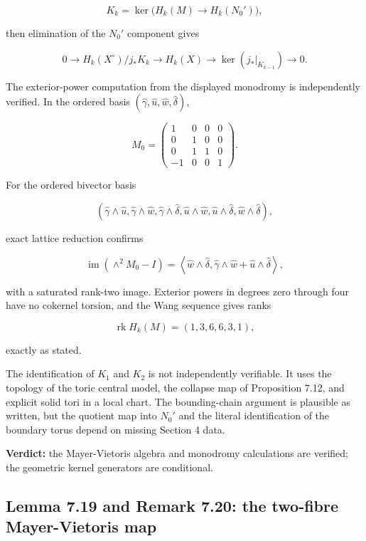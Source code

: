\documentclass[
  10pt,
]{article}
\begin{document}
\[
K_k=\ker\bigl(H_k(M)\to H_k(N_0')\bigr),
\]

then elimination of the \(N_0'\) component gives

\[
0\to H_k(X^\circ)/j_*K_k\to H_k(X)
\to\ker(j_*|_{K_{k-1}})\to0.
\]

The exterior-power computation from the displayed monodromy is
independently verified. In the ordered basis
\((\widehat\gamma,\widehat u,\widehat w,\widehat\delta)\),

\[
M_0=
\begin{pmatrix}
1&0&0&0\\
0&1&0&0\\
0&1&1&0\\
-1&0&0&1
\end{pmatrix}.
\]

For the ordered bivector basis

\[
(\widehat\gamma\wedge\widehat u,
 \widehat\gamma\wedge\widehat w,
 \widehat\gamma\wedge\widehat\delta,
 \widehat u\wedge\widehat w,
 \widehat u\wedge\widehat\delta,
 \widehat w\wedge\widehat\delta),
\]

exact lattice reduction confirms

\[
\operatorname{im}(\wedge^2M_0-I)
 =\left\langle
 \widehat w\wedge\widehat\delta,
 \widehat\gamma\wedge\widehat w+\widehat u\wedge\widehat\delta
 \right\rangle,
\]

with a saturated rank-two image. Exterior powers in degrees zero through
four have no cokernel torsion, and the Wang sequence gives ranks

\[
\operatorname{rk}H_k(M)=(1,3,6,6,3,1),
\]

exactly as stated.

The identification of \(K_1\) and \(K_2\) is not independently
verifiable. It uses the topology of the toric central model, the
collapse map of Proposition 7.12, and explicit solid tori in a local
chart. The bounding-chain argument is plausible as written, but the
quotient map into \(N_0'\) and the literal identification of the
boundary torus depend on missing Section 4 data.

\textbf{Verdict:} the Mayer-Vietoris algebra and monodromy calculations
are verified; the geometric kernel generators are conditional.

\subsection{Lemma 7.19 and Remark 7.20: the two-fibre Mayer-Vietoris
map}\label{lemma-7.19-and-remark-7.20-the-two-fibre-mayer-vietoris-map}
\end{document}
